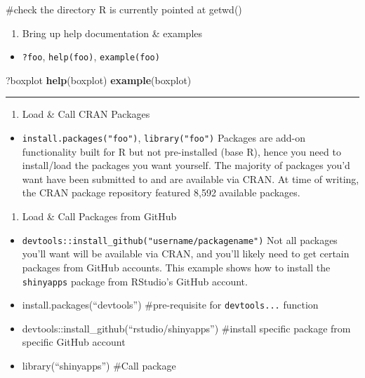\documentclass[]{book}
\newenvironment{Shaded}{\begin{snugshade}}{\end{snugshade}}
\newcommand{\KeywordTok}[1]{\textcolor[rgb]{0.13,0.29,0.53}{\textbf{#1}}}
\newcommand{\NormalTok}[1]{#1}
\providecommand{\tightlist}{%
  \setlength{\itemsep}{0pt}\setlength{\parskip}{0pt}}
\begin{document}
\#check the directory R is currently pointed at
getwd()

\begin{enumerate}
\def\labelenumi{\arabic{enumi}.}
\setcounter{enumi}{1}
\tightlist
\item
  Bring up help documentation \& examples
\end{enumerate}

\begin{itemize}
\tightlist
\item
  \texttt{?foo}, \texttt{help(foo)}, \texttt{example(foo)}
\end{itemize}

\begin{Shaded}
\begin{Highlighting}[]
\NormalTok{?boxplot}
\KeywordTok{help}\NormalTok{(boxplot)}
\KeywordTok{example}\NormalTok{(boxplot)}
\end{Highlighting}
\end{Shaded}

\begin{center}\rule{0.5\linewidth}{0.5pt}\end{center}

\begin{enumerate}
\def\labelenumi{\arabic{enumi}.}
\setcounter{enumi}{2}
\tightlist
\item
  Load \& Call CRAN Packages
\end{enumerate}

\begin{itemize}
\tightlist
\item
  \texttt{install.packages("foo")}, \texttt{library("foo")}
  Packages are add-on functionality built for R but not pre-installed (base R), hence you need to install/load the packages you want yourself. The majority of packages you'd want have been submitted to and are available via CRAN. At time of writing, the CRAN package repository featured 8,592 available packages.
\end{itemize}

\begin{enumerate}
\def\labelenumi{\arabic{enumi}.}
\setcounter{enumi}{3}
\tightlist
\item
  Load \& Call Packages from GitHub
\end{enumerate}

\begin{itemize}
\tightlist
\item
  \texttt{devtools::install\_github("username/packagename")}
  Not all packages you'll want will be available via CRAN, and you'll likely need to get certain packages from GitHub accounts. This example shows how to install the \texttt{shinyapps} package from RStudio's GitHub account.
\item
  install.packages(``devtools'') \#pre-requisite for \texttt{devtools...} function
\item
  devtools::install\_github(``rstudio/shinyapps'') \#install specific package from specific GitHub account
\item
  library(``shinyapps'') \#Call package
\end{itemize}
\end{document}
